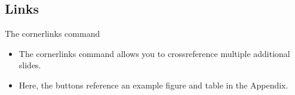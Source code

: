 
\subsection{Links}

\begin{frame}{The cornerlinks command}
\label{slide:cornerlinks}

\begin{itemize}

\item The cornerlinks command allows you to crossreference multiple additional slides.
\item Here, the buttons reference an example figure and table in the Appendix. 

\end{itemize}


\end{frame}

